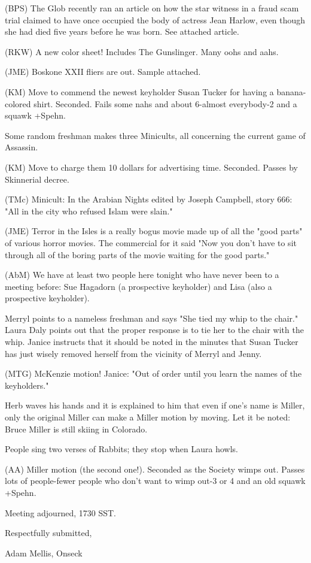 \documentclass[12pt]{article}
\begin{document}
(BPS) The Glob recently ran an article on how the star witness in a fraud scam trial claimed to have once occupied the body of actress Jean Harlow, even though she had died five years before he was born. See attached article.

(RKW) A new color sheet! Includes The Gunslinger. Many oohs and aahs.

(JME) Boskone XXII fliers are out. Sample attached.

(KM) Move to commend the newest keyholder Susan Tucker for having a banana-colored shirt. Seconded. Fails some nahs and about 6-almost everybody-2 and a squawk +Spehn.

Some random freshman makes three Minicults, all concerning the current game of Assassin.

(KM) Move to charge them 10 dollars for advertising time. Seconded. Passes by Skinnerial decree.

(TMc) Minicult: In the Arabian Nights edited by Joseph Campbell, story 666: "All in the city who refused Islam were slain."

(JME) Terror in the Isles is a really bogus movie made up of all the "good parts" of various horror movies. The commercial for it said "Now you don't have to sit through all of the boring parts of the movie waiting for the good parts."

(AbM) We have at least two people here tonight who have never been to a meeting before: Sue Hagadorn (a prospective keyholder) and Lisa (also a prospective keyholder).

Merryl points to a nameless freshman and says "She tied my whip to the chair." Laura Daly points out that the proper response is to tie her to the chair with the whip. Janice instructs that it should be noted in the minutes that Susan Tucker has just wisely removed herself from the vicinity of Merryl and Jenny.

(MTG) McKenzie motion! Janice: "Out of order until you learn the names of the keyholders."

Herb waves his hands and it is explained to him that even if one's name is Miller, only the original Miller can make a Miller motion by moving. Let it be noted: Bruce Miller is still skiing in Colorado.

People sing two verses of Rabbits; they stop when Laura howls.

(AA) Miller motion (the second one!). Seconded as the Society wimps out. Passes lots of people-fewer people who don't want to wimp out-3 or 4 and an old squawk +Spehn.

\vspace{12pt}

\noindent
Meeting adjourned, 1730 SST.

\vspace{18pt}

\centerline{Respectfully submitted,}
\centerline{Adam Mellis, Onseck}
\end{document}

